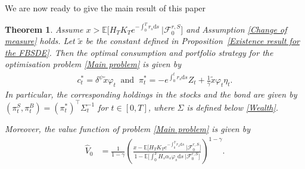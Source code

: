 \documentclass[12,reqno]{amsart}
\numberwithin{equation}{section}
\newtheorem{thm}[defi]{Theorem}
\begin{document}
We are now ready to give the main result of this paper
\begin{thm}\label{Mainresult1}
	Assume $x>\mathbb{E}\big[H_{T}K_{T}e^{-\int_{0}^{T}r_{s}\mathrm{d}s}~\big|\mathcal{F}_{0}^{r,S}\big]$ and Assumption \ref{Change of measure} holds. Let $\widetilde{x}$ be the constant defined in Proposition~\ref{Existence result for the FBSDE}. Then the optimal consumption and portfolio strategy for the optimisation problem \eqref{Main problem} is given by
	\begin{align}\label{Optimal strategy}
		c_{t}^{*}=\delta^{\psi}\widetilde{x}\varphi_{t}~\text{ and }~\pi_{t}^{*}=-e^{\int_{0}^{t}r_{s}\mathrm{d}s}Z_{t}+\frac{1}{\gamma}\widetilde{x}\varphi_{t}\eta_{t}.
	\end{align}
	In particular, the corresponding holdings in the stocks and the bond are given by\\ $(\pi_{t}^{S},\pi_{t}^{B})=(\pi_{t}^{*})^{\top}\Sigma_{t}^{-1}$ for $t\in[0,T]$, where $\Sigma$ is defined below \eqref{Wealth}.
	
	Moreover, the value function of problem \eqref{Main problem} is given by 
	\begin{align}\label{Optimal value function}
		\widehat{V}_{0}&=\frac{1}{1-\gamma}\left(\frac{x-\mathbb{E}\big[H_{T}K_{T}e^{-\int_{0}^{T}r_{s}\mathrm{d}s}~\big|\mathcal{F}_{0}^{r,S}\big]}{1-\mathbb{E}\big[\int_{0}^{T}H_{s}\alpha_{s}\varphi_{s}\mathrm{d}s~\big|\mathcal{F}_{0}^{r,S}\big]}\right)^{1-\gamma}.
	\end{align}
\end{thm}
\end{document}
